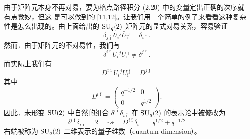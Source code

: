 由于矩阵元本身不再对易，要为格点路径积分 (2.20) 中的变量定出正确的次序就有点微妙，但这
是可以做到的 [11,12]。让我们用一个简单的例子来看看这种复杂性是怎么出现的。由上面给出的
$\mathrm{SU}_q(2)$ 矩阵元的显式对易关系，容易验证
\begin{equation}
  \delta_{j\bar{\jmath}}U_i{}^j\bar{U}_{\bar{\imath}}{}^{\bar{\jmath}}=\delta_{i\bar{\imath}}.
  \tag{2.24}
\end{equation}
然而，由于矩阵元的不对易性，我们有
\begin{equation}
  \delta^{i\bar{\imath}}U_i{}^j\bar{U}_{\bar{\imath}}{}^{\bar{\jmath}}\neq\delta^{j\bar{\jmath}}.
  \tag{2.25}
\end{equation}
而实际上我们有
\begin{equation}
  D^{i\bar{\imath}}U_i{}^j\bar{U}_{\bar{\imath}}{}^{\bar{\jmath}}=D^{j\bar{\jmath}}
  \tag{2.26}
\end{equation}
其中
\begin{equation}
  D^{i\bar{\imath}}=\begin{pmatrix}q^{-1/2}&0\\0&q^{1/2}\end{pmatrix}.
  \tag{2.27}
\end{equation}
因此，未形变 $\mathrm{SU}(2)$ 中自然的组合 $\delta^{i\bar{\imath}}\delta_{i\bar{\imath}}$ 在 $\mathrm{SU}_q(2)$
的表示论中被修改为
\begin{equation}
  \delta^{i\bar{\imath}}\delta_{i\bar{\imath}}=2
  \quad\rightsquigarrow\quad
  D^{i\bar{\imath}}\delta_{i\bar{\imath}}=q^{1/2}+q^{-1/2}
  \tag{2.28}
\end{equation}
右端被称为 $\mathrm{SU}_q(2)$ 二维表示的量子维数（quantum dimension）。

